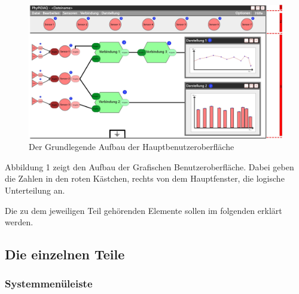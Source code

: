 \documentclass[parskip=full]{scrartcl}
\begin{document}
\begin{figure}[h]
	\begin{center}
		\includegraphics[width = 12cm]{Grafik/GUI-mit-Segmenten.jpg}
		\caption{Der Grundlegende Aufbau der Hauptbenutzeroberfläche}
		\label{GUI_Grundlage}
	\end{center}
\end{figure}

Abbildung 1 zeigt den Aufbau der Grafischen Benutzeroberfläche. Dabei geben die Zahlen in den roten Kästchen, rechts von dem Hauptfenster, die logische Unterteilung an.

Die zu dem jeweiligen Teil gehörenden Elemente sollen im folgenden erklärt werden.

\subsection{Die einzelnen Teile}

\subsubsection{Systemmenüleiste}
\end{document}
